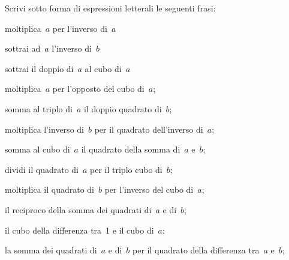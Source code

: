 \begin{esercizio}
\label{ese:8.12}
Scrivi sotto forma di espressioni letterali le seguenti frasi:
\begin{enumeratea}
\item moltiplica~\(a\) per l'inverso di~\(a\)
\item sottrai ad~\(a\) l'inverso di~\(b\)
\item sottrai il doppio di~\(a\) al cubo di~\(a\)
\item moltiplica~\(a\) per l'opposto del cubo di~\(a\);
\item somma al triplo di~\(a\) il doppio quadrato di~\(b\);
\item moltiplica l'inverso di~\(b\) per il quadrato dell'inverso di~\(a\);
\item somma al cubo di~\(a\) il quadrato della somma di~\(a\) e~\(b\);
\item dividi il quadrato di~\(a\) per il triplo cubo di~\(b\);
\item moltiplica il quadrato di~\(b\) per l'inverso del cubo di~\(a\);
\item il reciproco della somma dei quadrati di~\(a\) e di~\(b\);
\item il cubo della differenza tra~1 e il cubo di~\(a\);
\item la somma dei quadrati di~\(a\) e di~\(b\) per il quadrato della 
  differenza tra~\(a\) e~\(b\);
\end{enumeratea}
\end{esercizio}

% 
% 


